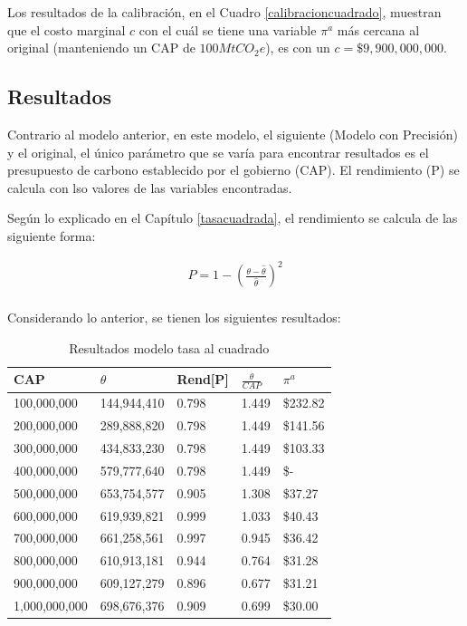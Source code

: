 Los resultados de la calibración, en el Cuadro \ref{calibracioncuadrado}, muestran que el costo marginal $c$ con el cuál se tiene una variable $\pi^a$ más cercana al original (manteniendo un CAP de $100MtCO_{2}e$), es con un $c=\$9,900,000,000$.

\subsection{Resultados}

Contrario al modelo anterior, en este modelo, el siguiente (Modelo con Precisión) y el original, el único parámetro que se varía para encontrar resultados es el presupuesto de carbono establecido por el gobierno (CAP). El rendimiento (P) se calcula con lso valores de las variables encontradas.
\vspace{2.5mm}

Según lo explicado en el Capítulo \ref{tasacuadrada}, el rendimiento se calcula de las siguiente forma: 
\vspace{2.5mm}

\begin{equation}
\begin{array}{rrclcl}
\displaystyle P = 1- (\frac{{\theta - \hat{\theta}}}{\hat{\theta}})^2 \\
\end{array}
\end{equation}

Considerando lo anterior, se tienen los siguientes resultados:

\begin{table}[H]
    \centering
    \begin{tabular}{|l|l|l|l|l|}
    \hline
        CAP & $\theta$ & Rend[P] & $\frac{\theta}{CAP}$  & $\pi^a$  \\ \hline
        100,000,000 & 144,944,410  & 0.798  & 1.449  &  \$232.82   \\ \hline
        200,000,000 & 289,888,820  & 0.798  & 1.449  &  \$141.56   \\ \hline
        300,000,000 & 434,833,230  & 0.798  & 1.449  &  \$103.33   \\ \hline
        400,000,000 & 579,777,640  & 0.798  & 1.449  &  \$-   \\ \hline
        500,000,000 & 653,754,577  & 0.905  & 1.308  &  \$37.27   \\ \hline
        600,000,000 & 619,939,821  & 0.999  & 1.033  &  \$40.43   \\ \hline
        700,000,000 & 661,258,561  & 0.997  & 0.945  &  \$36.42   \\ \hline
        800,000,000 & 610,913,181  & 0.944  & 0.764  &  \$31.28   \\ \hline
        900,000,000 & 609,127,279  & 0.896  & 0.677  &  \$31.21   \\ \hline
        1,000,000,000 & 698,676,376  & 0.909  & 0.699  &  \$30.00   \\ \hline
    \end{tabular}
    \caption{{\footnotesize Resultados modelo tasa al cuadrado}}
    \label{resultadostasacuadrada}
\end{table}

